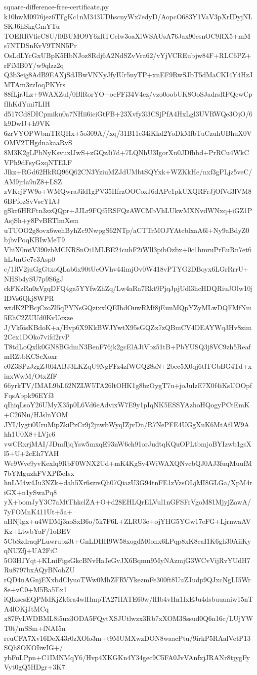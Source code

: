 \documentclass[11pt]{article}
\theoremstyle{definition}
\theoremstyle{remark}
\begin{document}
\begin{filecontents*}[overwrite]{square-difference-free-certificate.py}
k10hwM0976jez6TFgKc1nM343UDhscnyWx7edyD/AopcO683Y1VaV3pXrIDyjNLSKJ6hSkgGmYTu
TOERRVficC8U/l0BUMO9Y6zRTCelw3oaXiWSAUsA76Jax90esnOC9RX5+mMs7NTDSnKvV9TNN5Pr
OsLdLYcGxUBpK5HbNJoz8Rdj6A2NdSZvVra62/vYjVCREubjw84F+RLC6PZ+rFiMB0Y/w9qlzz2q
Q3b3eig8AdB9EAXjSdJBwVNNyJfyIUr5nyTP+xnEF9RwSJbT5dMaCKI4Y4HzJMTAm3zzIoqPKYrs
88fLjrJLz+9WAXZul/0BlRorYO+oeFFi34V4ez/vzo0oobUK8OoSJadrsRPQcwCpfIhKdYmi7LIH
d517Cd8DICpmiku0a7NHii6iciGtFB+23Xvfy3l3CSjPfA4HxLgl3UVRWQe3OjO/6k9DwlJ+h9VK
6zrVYOPWbmTRQHx+5o309A//xq/31B11c34iKkd2YoDkMfbTuCzuhUBhuX0VOMV2THgdnakaaRvS
8M3K2gLPbNyKsvuxlJwS+zGQz3i7d+7LQNhU3IgorXn0JDfhbd+PrRCu4WkCVPh9dFsyGxqNTELF
Jlkz+RGd62HkRQ96Q62CN3YziuMZJdUMbtSQYxk+WZKkHe/nxf3gPLjz5veC/AM9jrla9nZ8+LSZ
zVKejFW9o+WMQwraJild1gPV35HfrzOOCoxJ6dAPe1pkUXQRFrJjOfVd3lVM86BPfozSvVscYIAJ
gSkr6HRFtn3zzQQpr+JJLr9FQf5RSFQzAWCMbVhLUkwMXNvdWNxq+iGZ1PAsjSh+y8PvBRTlmXem
uTUOO2g8ovx6wehByhZc9NwpgS62NTp/aCTTrMOJYAtcblxaA6l+Ny9aBdyZ0bjbvPoqKBIwMeT9
VhiX0mtV390zbMCKRSnOi1MLBE24cuhF2iWll3pibOzbx+0c1hmruPrEuRn7et6hLJmGe7c3Asp0
c/1RV2juGgGtxoQLab6x90tUeOVhv44imjOv0W418vPTYG2DBoyx6LGrRrrU+NHSb4ySU7p9S6gJ
ckFKzRn0zVgqDFQ4ga5YYfwZhZq/Lw4aRa7Rkt9PjqJpjUdl3hcHDQRiuJOlw10jIDVs6Qkj8WPR
wtdK2PBcjCzoZl5qPYNsGQzixxlQEIbdOuwRMf8jEunMQpYZyMLwDQFMfNm5EhC2ZUUd0KvUcxze
J/Vk5isKBdoK+a/Hvp6X9KkBWJYwtX95sGQZx7zQBmCV4DEAYWq3Hv8zim2Cex1DOko7vifd2rvP
T8tdLoQxlk0GN8BGdmN3BenF76jk2gcElAJiVbz51tB+PbYUSQ3j8VC9zh5ReafmRZtbKCScXoxr
e0Z3SPzJzgZJ0l4ABJ3LKZqU9NgFFz4zfWGQ28sN+2bec5X0qj6tlTGbBG4Td+xinxWwM/OtxZfF
66yrkTV/IMAL9bL62NZLW5TA26ltOHK1g8bzOygT7u+joJulzE7X0f4iKsUOOpfFqsAbpk96EYf3
qIhiqLsoY26UMyX35p0L6Vd6eAdvixW7E9y1pIqNK5ESSYAzhoHQogyPCtEmK+C26Nu/HJslnYOM
JYI/lygti0UruMipZkiPzCr9j2jnwbWyqIZjvDn/R7NePFE4UGgXuK6MtAf1W9Ahh1U0X8+LVjc6
vwCRxrjMAI/JDmfIjqYsw5mxqE93nW6ch91orJudtqKQuOPLtbmjoBYIzwb1gsXl5+U+2cEh7YAH
We9Wve9yvKexlq9RbF0WNX2Ud+mK4KgSv4WiWAXQNvcbQJ0AJ3fuqMuufM7bYMguzhFVXPf5eIsx
hnLM4w4Ju3NZk+dah5Xr6szrsQh07QiazU3G94tnFE1zVzsOLjMI8GLGa/XpM4riGX+n1ySwaPq8
yX+bomJyY3C7aMtThkclZA+O+d28EHLQrELVul1nGFSFrVgoM81MjyjZawA/7yFOMnK411Ut+5a+
aHNjlgx+u4WDMj3aoSxB6o/5k7F6L+ZLRU3e+ojYHG5YGw17eFG+LjrnwaAVKz+LtwbYaF/1oBEV
5CbSzdraqPLuwrubz3t+GnLDHH9W58xogdM0onx6LPqp8xK8caI1K6gh30AiiKyqNUZfj+UA2FiC
5O3HJYqt+KLniFigsGkcBNvHaJeGvJX6Bqmn9MyNAzmjG3WCvVijRvYUdH7Ru8797bxAQyBNohZU
rQD4nAGnjEXxbdClyuoTWw0MhZFRVYkezmFe300ft8UuZJudp9QJxcNgLI5Wr8e+vC0+M5Ba5Ex1
iQIxscsEQPMdKjZk6ra4wlHmpTA27IIATE60w/lHb4vHn1IxEJu4dsbuuaniw15nTA4lOKjJtMCq
x87FyLWDBML8i5ux3ODA5FQytXSJUtlwzx3Rb7xXOM3Sssud0Q6n16c/LUjYWT0t/mSSm+fNAI5n
reuCFA7Xv16DeX43r0zXOlo3m+t9MUMXwzDON8waacPtu/9irkP5RAalVetP13SQh8OKOIiwIG+/
ybFuLPpn+C1IMNMqY6/Hvp4XKGKn4Y34gec9C5FA0JvVAnfxjJRANr8tjygFyVyt0gQ5HDgr+3K7

\end{filecontents*}
\end{document}
